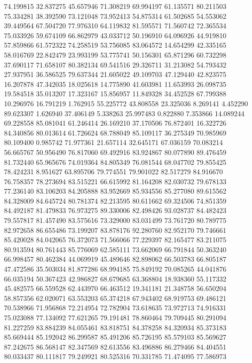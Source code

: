 74.199815
32.837275
45.657946
71.308219
69.994197
61.135571
80.211503
75.334281
38.392590
73.121048
73.952413
54.875314
61.502685
54.553062
39.449564
67.504720
77.976310
64.119832
81.595571
71.560742
72.365534
75.033926
59.674109
66.862979
43.033712
50.196910
64.096926
44.919810
57.859866
61.572322
74.258519
53.756085
83.064572
14.654299
42.335165
58.016769
22.842479
23.993199
53.775741
50.156301
65.871296
60.732298
37.690117
71.658107
80.382134
69.541516
29.326711
31.213082
54.793432
27.937951
36.586525
79.637344
21.605022
49.109703
47.129440
42.823575
16.207878
47.342035
18.025618
14.775890
41.603981
11.653993
26.098735
19.584518
35.013207
17.323167
15.856957
11.849328
34.452528
67.799388
10.296976
16.791219
1.762915
55.225772
43.808558
23.325036
8.269141
4.452290
89.623307
1.626940
37.406149
5.338263
25.997483
0.822880
7.353866
14.089244
69.228558
85.081041
61.246414
26.169210
37.170506
76.872401
16.322726
84.340856
80.013614
61.726624
68.788049
85.109117
36.275349
70.985969
80.109400
0.985742
71.977361
21.657114
32.645171
67.036159
70.083214
56.665767
50.956490
76.817060
69.492916
83.924867
80.077890
89.476459
81.732440
65.965676
74.019364
84.805349
76.081544
68.047702
79.855425
78.424231
8.951627
63.895706
79.774551
79.901022
82.517279
84.916670
76.758357
78.273694
83.515221
66.615992
81.164208
82.030732
79.678133
77.236140
83.106203
84.205888
83.952669
85.934556
85.277080
89.615562
84.328009
84.645724
80.781374
82.213595
80.611662
69.324506
74.851359
84.492187
81.479833
76.973275
89.330006
82.498426
93.028737
84.482423
79.557817
81.457490
83.575616
73.329000
83.031499
73.761720
80.789775
82.972658
86.655486
73.199207
83.878176
92.280760
82.952170
79.746661
85.420028
84.042065
76.372073
71.566066
77.229397
82.165477
83.211075
80.913594
80.761443
85.776069
62.585111
73.662069
66.791844
50.363240
66.998457
80.462384
44.069919
45.489646
82.898062
66.503783
66.805187
47.472586
35.503034
81.877286
68.994185
75.849192
70.085265
44.041876
66.035194
50.367423
42.986827
68.679685
63.368804
18.938360
55.117332
45.482575
66.559528
62.443970
66.463512
19.341181
21.348758
56.650204
58.857356
62.020071
63.553203
65.374218
67.943402
68.919753
69.486121
70.538966
71.956868
72.214954
72.782904
73.618635
73.972713
74.916331
75.023088
77.134092
77.621265
79.191481
78.860464
79.709445
80.291094
81.227259
83.884239
84.055461
83.818751
84.378258
84.320934
85.373183
85.669444
85.192042
86.299587
85.491206
85.726195
85.579103
85.569627
87.242675
86.568147
82.347569
82.613556
83.496886
86.279466
84.404551
80.033437
80.111817
79.249921
80.525316
70.331785
71.474095
77.586973
